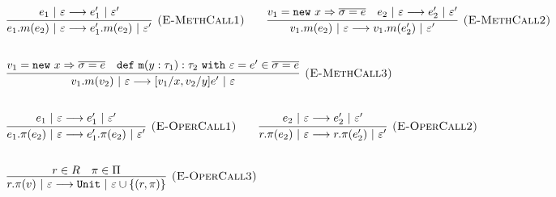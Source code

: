 \documentclass{llncs}
\newcommand{\keywadj}[1]{\mathtt{#1}}
\newcommand{\keyw}[1]{\keywadj{#1}~}
\begin{document}
\[
\begin{array}{lll}
\begin{array}{lllr}
	\infer[\textsc{(E-MethCall1)}]
		{e_1.m(e_2)~|~\varepsilon \longrightarrow e_1'.m(e_2)~|~\varepsilon'}
		{e_1~|~\varepsilon \longrightarrow e_1'~|~\varepsilon'}
		
		~~~~~~
		
	\infer[\textsc{(E-MethCall2)}]
		{v_1.m(e_2)~|~\varepsilon \longrightarrow v_1.m(e_2')~|~\varepsilon'}
		{v_1 = \keywadj{new}~x \Rightarrow \overline{\sigma = e} & e_2~|~\varepsilon \longrightarrow e_2'~|~\varepsilon'}\\[5ex]
		
	\infer[\textsc{(E-MethCall3)}]
		{v_1.m(v_2)~|~\varepsilon
			\longrightarrow
		 [v_1/x, v_2/y]e'~|~\varepsilon}
  		{v_1 = \keywadj{new}~x \Rightarrow \overline{\sigma = e} & \keywadj{def~m}(y: \tau_1) : \tau_2~\keyw{with} \varepsilon = e' \in \overline {\sigma = e}} \\[5ex]

			
	\infer[\textsc{(E-OperCall1)}]
		{e_1.\pi(e_2)~|~\varepsilon
			\longrightarrow
		 e_1'.\pi(e_2)~|~\varepsilon'}
		{e_1~|~\varepsilon \longrightarrow e_1'~|~\varepsilon'}
~~~~~~
			\infer[\textsc{(E-OperCall2)}]
		{r.\pi(e_2)~|~\varepsilon
			\longrightarrow
		 r.\pi(e_2')~|~\varepsilon'}
		{e_2~|~\varepsilon \longrightarrow e_2'~|~\varepsilon'} \\[5ex]
			
			\infer[\textsc{(E-OperCall3)}]
		{r.\pi(v)~|~\varepsilon
			\longrightarrow
		 \keywadj{Unit}~|~\varepsilon \cup \{(r, \pi)\}}
		{r \in R & \pi \in \Pi} \\[5ex]
			
		
\end{array}
\end{array}
\]


\newpage
\end{document}
